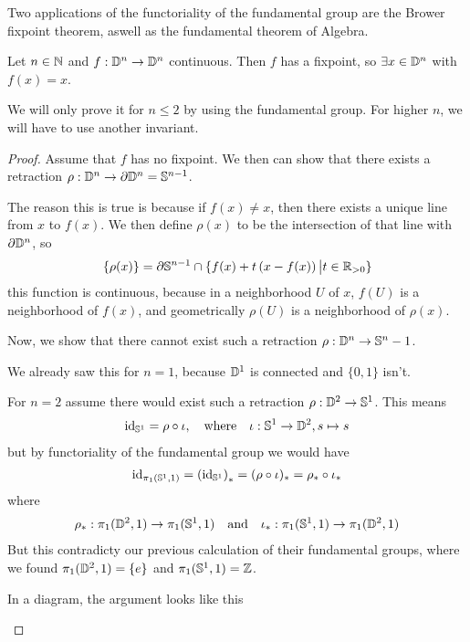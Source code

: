 Two applications of the functoriality of the fundamental group are the Brower fixpoint theorem, aswell as the fundamental theorem of Algebra.


\begin{thm}
  Let $n \in \mathbb{N}$ and $f: \mathbb{D}^{n} \to \mathbb{D}^{n}$ continuous. 
  Then $f$ has a fixpoint, so $\exists x \in \mathbb{D}^{n}$ with $f(x) = x$.
\end{thm}
We will only prove it for $n \leq 2$ by using the fundamental group. For higher $n$, we will have to use another invariant. 
\begin{proof}
  Assume that $f$ has no fixpoint.
  We then can show that there exists a retraction $\rho: \mathbb{D}^{n} \to  \partial \mathbb{D}^{n} = \mathbb{S}^{n-1}$.

  The reason this is true is because if $f(x) \neq x$, then there exists a unique line from $x$ to $f(x)$.
  We then define $\rho(x)$ to be the intersection of that line with $\partial \mathbb{D}^{n}$, so
  \begin{align*}
    \{\rho(x)\} = \partial \mathbb{S}^{n-1} \cap \{f(x) + t\left(
        x - f(x)
    \right) \big\vert t \in \mathbb{R}_{> 0}\}
  \end{align*}
  this function is continuous, because in a neighborhood $U$ of $x$, $f(U)$ is a neighborhood of $f(x)$, and geometrically $\rho(U)$ is a neighborhood of $\rho(x)$.

  Now, we show that there cannot exist such a retraction $\rho: \mathbb{D}^{n} \to \mathbb{S}^{n}-1$.

  We already saw this for $n = 1$, because $\mathbb{D}^{1}$ is connected and $\{0,1\}$ isn't.

  For $n = 2$ assume there would exist such a retraction $\rho: \mathbb{D}^{2} \to \mathbb{S}^{1}$.
  This means
  \begin{align*}
   \operatorname{id}_{\mathbb{S}^{1}} = \rho \circ \iota, \quad \text{where} \quad \iota: \mathbb{S}^{1} \to \mathbb{D}^{2}, s \mapsto s
  \end{align*}
  but by functoriality of the fundamental group we would have
  \begin{align*}
    \operatorname{id}_{\pi_1(\mathbb{S}^{1},1)} = \left(
      \operatorname{id}_{\mathbb{S}^{1}}
    \right)_\ast 
    =
    (\rho \circ \iota)_{\ast} = \rho_{\ast} \circ \iota_{\ast}
  \end{align*}
  where
  \begin{align*}
    \rho_{\ast}: \pi_1(\mathbb{D}^{2},1) \to  \pi_1(\mathbb{S}^{1},1) \quad \text{and} \quad \iota_{\ast}: \pi_1(\mathbb{S}^{1},1) \to  \pi_1(\mathbb{D}^{2},1)
  \end{align*}
  But this contradicty our previous calculation of their fundamental groups, where we found 
  $\pi_1(\mathbb{D}^{2},1) = \{e\}$ and $\pi_{1}(\mathbb{S}^{1},1) = \mathbb{Z}$.

  In a diagram, the argument looks like this
  \begin{center}
  \end{center}
\end{proof}

